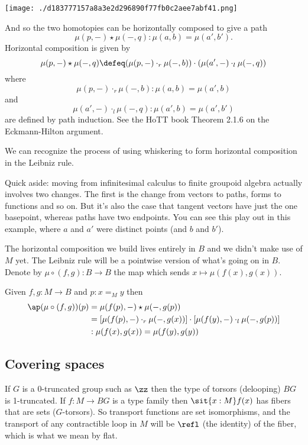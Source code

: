 \texttt{[image: ./d183777157a8a3e2d296890f77fb0c2aee7abf41.png]}

And so the two homotopies can be horizontally composed to give a path
\[\mu(p,-)\star\mu(-,q): \mu(a, b)=\mu(a',b').\] Horizontal composition
is given by
\[\mu(p,-)\star\mu(-,q)\defeq(\mu(p,-)\cdot_r \mu(-,b))\cdot(\mu(a', -)\cdot_l\mu(-, q))\]
where \[\mu(p,-)\cdot_r\mu(-,b):\mu(a,b)=\mu(a',b)\] and
\[\mu(a',-)\cdot_l\mu(-,q):\mu(a',b)=\mu(a',b')\] are defined by path
induction. See the HoTT book Theorem 2.1.6 on the Eckmann-Hilton
argument\cite{hottbook}.

We can recognize the process of using whiskering to form horizontal
composition in the Leibniz rule.

Quick aside: moving from infinitesimal calculus to finite groupoid
algebra actually involves two changes. The first is the change from
vectors to paths, forms to functions and so on. But it's also the case
that tangent vectors have just the one basepoint, whereas paths have two
endpoints. You can see this play out in this example, where \(a\) and
\(a'\) were distinct points (and \(b\) and \(b'\)).

The horizontal composition we build lives entirely in \(B\) and we
didn't make use of \(M\) yet. The Leibniz rule will be a pointwise
version of what's going on in \(B\). Denote by \(\mu\circ(f,g):B\to B\)
the map which sends \(x\mapsto \mu(f(x),g(x))\).

\begin{mylemma}
Given \( f, g:M\to B \) and \( p:x=_M y \) then 
\begin{align*}
 \ap(\mu\circ(f,g))(p)&=\mu(f(p),-)\star\mu(-,g(p))\\
 &=\left[\mu(f(p),-)\cdot_r \mu(-,g(x))\right]\cdot \left[\mu(f(y),-)\cdot_l\mu(-,g(p))\right]\\
 &:\mu(f(x),g(x))=\mu(f(y),g(y))
\end{align*}
\end{mylemma}

\subsection{Covering spaces}\label{covering-spaces}

If \(G\) is a 0-truncated group such as \(\zz\) then the type of torsors
(delooping) \(BG\) is 1-truncated. If \(f:M\to BG\) is a type family
then \(\sit{x:M}f(x)\) has fibers that are sets (\(G\)-torsors). So
transport functions are set isomorphisms, and the transport of any
contractible loop in \(M\) will be \(\refl\) (the identity) of the
fiber, which is what we mean by flat.

